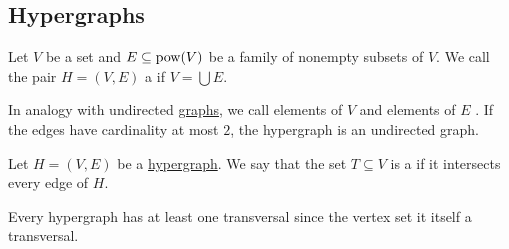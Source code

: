 \subsection{Hypergraphs}\label{subsec:hypergraphs}

\begin{definition}\label{def:hypergraph}\mcite\cite[30]{GondranMinoux1984Graphs}
  Let \( V \) be a set and \( E \subseteq \operatorname{pow}(V) \) be a family of nonempty subsets of \( V \). We call the pair \( H = (V, E) \) a  if \( V = \bigcup E \).

  In analogy with undirected \hyperref[def:undirected_graph]{graphs}, we call elements of \( V \)  and elements of \( E \) . If the edges have cardinality at most \( 2 \), the hypergraph is an undirected graph.
\end{definition}

\begin{definition}\label{def:hypergraph_transversal}\mcite\cite[32]{GondranMinoux1984Graphs}
  Let \( H = (V, E) \) be a \hyperref[def:hypergraph]{hypergraph}. We say that the set \( T \subseteq V \) is a  if it intersects every edge of \( H \).
\end{definition}

\begin{example}\label{ex:trivial_hypergraph_transversal}
  Every hypergraph has at least one transversal since the vertex set it itself a transversal.
\end{example}

